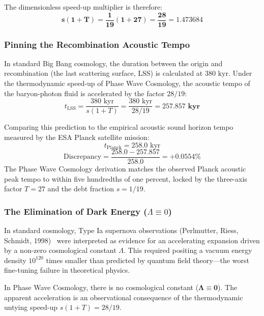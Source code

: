 \documentclass[11pt,a4paper]{article}
\begin{document}
The dimensionless speed-up multiplier is therefore:
\begin{equation}
\mathbf{s(1 + T) = \frac{1}{19}(1 + 27) = \frac{28}{19} = 1.473684}
\label{eq:speed_up_multiplier}
\end{equation}

\subsubsection{Pinning the Recombination Acoustic Tempo}

In standard Big Bang cosmology, the duration between the origin and recombination (the last scattering surface, LSS) is calculated at $380\text{ kyr}$. Under the thermodynamic speed-up of Phase Wave Cosmology, the acoustic tempo of the baryon-photon fluid is accelerated by the factor $28/19$:
\begin{equation}
t_{\text{LSS}} = \frac{380\text{ kyr}}{s(1 + T)} = \frac{380\text{ kyr}}{28/19} = \mathbf{257.857\text{ kyr}}
\end{equation}

Comparing this prediction to the empirical acoustic sound horizon tempo measured by the ESA Planck satellite mission:
\begin{equation}
t_{\text{Planck}} = 258.0\text{ kyr}
\end{equation}
\begin{equation}
\text{Discrepancy} = \frac{258.0 - 257.857}{258.0} = \mathbf{+0.0554\%}
\end{equation}
The Phase Wave Cosmology derivation matches the observed Planck acoustic peak tempo to within five hundredths of one percent, locked by the three-axis factor $T = 27$ and the debt fraction $s = 1/19$.

\subsubsection{The Elimination of Dark Energy (\texorpdfstring{$\Lambda \equiv 0$}{Lambda = 0})}

In standard cosmology, Type Ia supernova observations (Perlmutter, Riess, Schmidt, 1998)~\cite{Perlmutter1999,Riess1998} were interpreted as evidence for an accelerating expansion driven by a non-zero cosmological constant $\Lambda$. This required positing a vacuum energy density $10^{120}$ times smaller than predicted by quantum field theory---the worst fine-tuning failure in theoretical physics.

In Phase Wave Cosmology, there is no cosmological constant ($\mathbf{\Lambda \equiv 0}$). The apparent acceleration is an observational consequence of the thermodynamic untying speed-up $s(1+T) = 28/19$.
\end{document}
